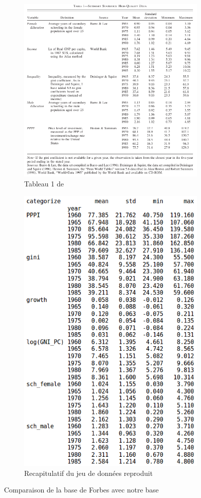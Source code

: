 \documentclass[11pt,a4paper]{article}
\begin{document}
\begin{figure}[h!]
\centering
\begin{subfigure}{0.55\textwidth}
  \centering
	\includegraphics[scale=0.55]{forbes_tableau_1.png}
	\caption{Tableau 1 de \cite{forbes}}
	\label{tableau_1}
\end{subfigure}%
\begin{subfigure}{.45\textwidth}
  \centering
  \includegraphics[width=.7\linewidth]{repro_data_resume.png}
  \caption{Recapitulatif du jeu de données reproduit}
  \label{data_resume}
\end{subfigure}
\caption{Comparaison de la base de Forbes avec notre base}
\label{data_closeness}
\end{figure}
\end{document}
